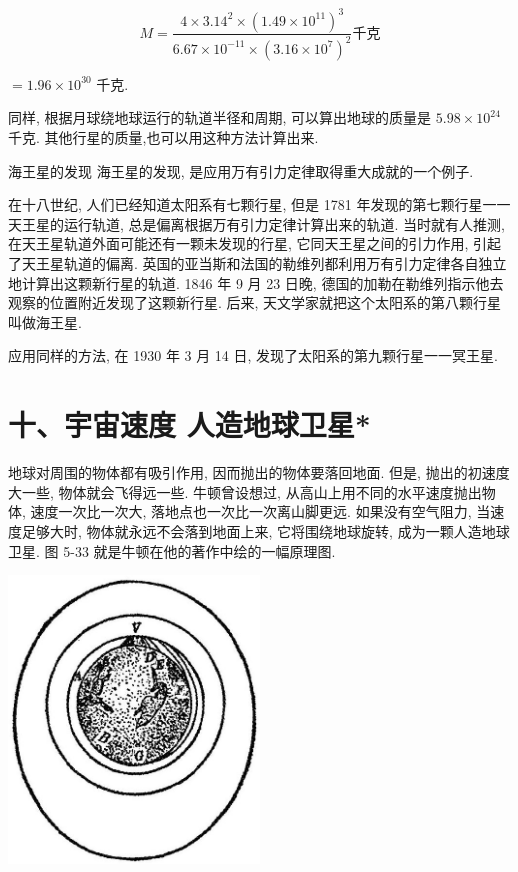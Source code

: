 \documentclass[10pt]{article}
\begin{document}
\[
M = \frac{4 \times {3.14}^{2} \times {\left( {1.49} \times {10}^{11}\right) }^{3}}{{6.67} \times {10}^{-{11}} \times {\left( {3.16} \times {10}^{7}\right) }^{2}}\text{千克}
\]

\(= {1.96} \times {10}^{30}\) 千克.

同样, 根据月球绕地球运行的轨道半径和周期, 可以算出地球的质量是 \({5.98} \times {10}^{24}\) 千克. 其他行星的质量,也可以用这种方法计算出来.

海王星的发现 海王星的发现, 是应用万有引力定律取得重大成就的一个例子.

在十八世纪, 人们已经知道太阳系有七颗行星, 但是 1781 年发现的第七颗行星一一天王星的运行轨道, 总是偏离根据万有引力定律计算出来的轨道. 当时就有人推测, 在天王星轨道外面可能还有一颗未发现的行星, 它同天王星之间的引力作用, 引起了天王星轨道的偏离. 英国的亚当斯和法国的勒维列都利用万有引力定律各自独立地计算出这颗新行星的轨道. 1846 年 9 月 23 日晚, 德国的加勒在勒维列指示他去观察的位置附近发现了这颗新行星. 后来, 天文学家就把这个太阳系的第八颗行星叫做海王星.

应用同样的方法, 在 1930 年 3 月 14 日, 发现了太阳系的第九颗行星一一冥王星.

\section*{十、宇宙速度 人造地球卫星*}

地球对周围的物体都有吸引作用, 因而抛出的物体要落回地面. 但是, 抛出的初速度大一些, 物体就会飞得远一些. 牛顿曾设想过, 从高山上用不同的水平速度抛出物体, 速度一次比一次大, 落地点也一次比一次离山脚更远. 如果没有空气阻力, 当速度足够大时, 物体就永远不会落到地面上来, 它将围绕地球旋转, 成为一颗人造地球卫星. 图 5-33 就是牛顿在他的著作中绘的一幅原理图.

\begin{center}
\includegraphics[max width=0.5\textwidth]{images/01912d55-147c-70aa-b0e0-1782a122f948_160_523008.jpg}
\end{center}
\end{document}
